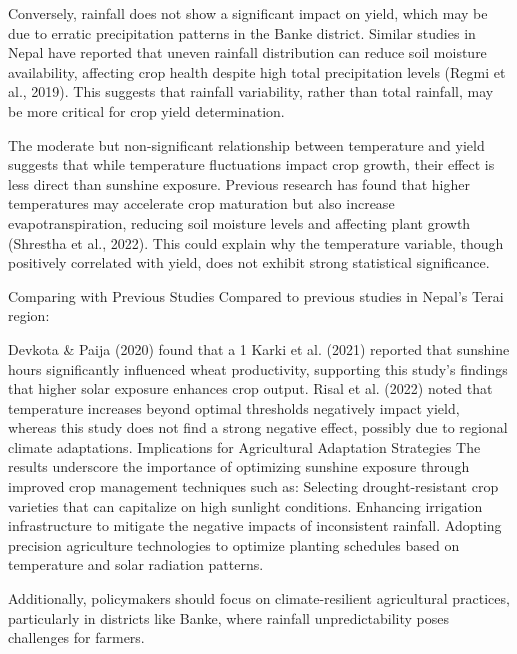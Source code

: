 Conversely, rainfall does not show a significant impact on yield, which may be due to erratic precipitation patterns in the Banke district. Similar studies in Nepal have reported that uneven rainfall distribution can reduce soil moisture availability, affecting crop health despite high total precipitation levels (Regmi et al., 2019). This suggests that rainfall variability, rather than total rainfall, may be more critical for crop yield determination.

The moderate but non-significant relationship between temperature and yield suggests that while temperature fluctuations impact crop growth, their effect is less direct than sunshine exposure. Previous research has found that higher temperatures may accelerate crop maturation but also increase evapotranspiration, reducing soil moisture levels and affecting plant growth (Shrestha et al., 2022). This could explain why the temperature variable, though positively correlated with yield, does not exhibit strong statistical significance.

Comparing with Previous Studies
Compared to previous studies in Nepal’s Terai region:

Devkota \& Paija (2020) found that a 1%
Karki et al. (2021) reported that sunshine hours significantly influenced wheat productivity, supporting this study’s findings that higher solar exposure enhances crop output.
Risal et al. (2022) noted that temperature increases beyond optimal thresholds negatively impact yield, whereas this study does not find a strong negative effect, possibly due to regional climate adaptations.
Implications for Agricultural Adaptation Strategies
The results underscore the importance of optimizing sunshine exposure through improved crop management techniques such as:
Selecting drought-resistant crop varieties that can capitalize on high sunlight conditions.
Enhancing irrigation infrastructure to mitigate the negative impacts of inconsistent rainfall.
Adopting precision agriculture technologies to optimize planting schedules based on temperature and solar radiation patterns.

Additionally, policymakers should focus on climate-resilient agricultural practices, particularly in districts like Banke, where rainfall unpredictability poses challenges for farmers.

